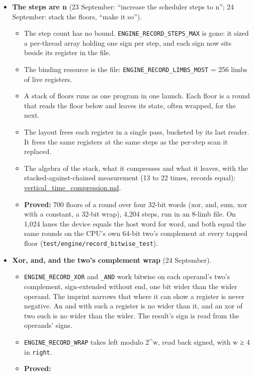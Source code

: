 \begin{itemize}
\item \textbf{The steps are n} (23 September: “increase the scheduler steps to n”; 24 September: stack the floors, “make it so”).

\begin{itemize}
\item The step count has no bound. \texttt{ENGINE\_\allowbreak{}RECORD\_\allowbreak{}STEPS\_\allowbreak{}MAX} is gone: it sized a per-thread array holding one sign per step, and each sign now sits beside its register in the file.
\item The binding resource is the file: \texttt{ENGINE\_\allowbreak{}RECORD\_\allowbreak{}LIMBS\_\allowbreak{}MOST} = 256 limbs of live registers.
\item A stack of floors runs as one program in one launch. Each floor is a round that reads the floor below and leaves its state, often wrapped, for the next.
\item The layout frees each register in a single pass, bucketed by its last reader. It frees the same registers at the same steps as the per-step scan it replaced.
\item The algebra of the stack, what it compresses and what it leaves, with the stacked-against-chained measurement (13 to 22 times, records equal): \hyperref[chap:vertical-time-compression]{vertical\_\allowbreak{}time\_\allowbreak{}compression.md}.
\item \textbf{Proved:} 700 floors of a round over four 32-bit words (xor, and, sum, xor with a constant, a 32-bit wrap), 4,204 steps, run in an 8-limb file. On 1,024 lanes the device equals the host word for word, and both equal the same rounds on the CPU's own 64-bit two's complement at every tapped floor (\texttt{test/\allowbreak{}engine/\allowbreak{}record\_\allowbreak{}bitwise\_\allowbreak{}test}).
\end{itemize}
\item \textbf{Xor, and, and the two's complement wrap} (24 September).

\begin{itemize}
\item \texttt{ENGINE\_\allowbreak{}RECORD\_\allowbreak{}XOR} and \texttt{\_\allowbreak{}AND} work bitwise on each operand's two's complement, sign-extended without end, one bit wider than the wider operand. The imprint narrows that where it can show a register is never negative. An and with such a register is no wider than it, and an xor of two such is no wider than the wider. The result's sign is read from the operands' signs.
\item \texttt{ENGINE\_\allowbreak{}RECORD\_\allowbreak{}WRAP} takes left modulo 2\textasciicircum{}w, read back signed, with w ≥ 4 in \texttt{right}.
\item \textbf{Proved:}


\end{itemize}
\end{itemize}
